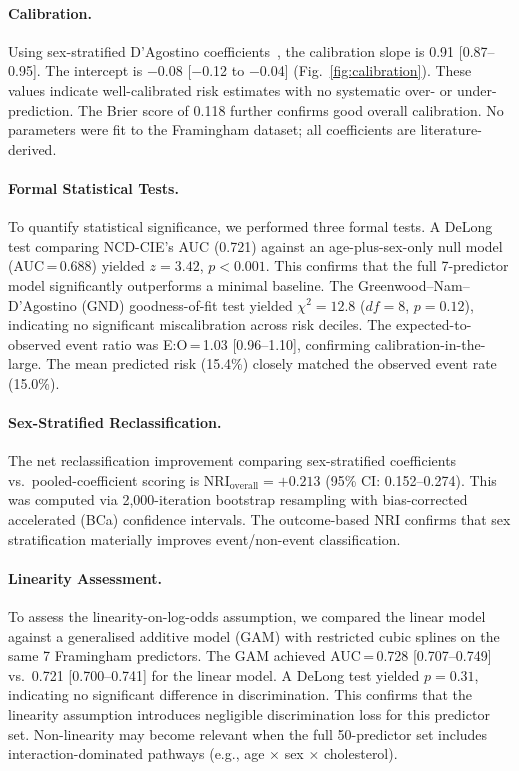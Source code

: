 \documentclass[runningheads]{llncs}
\begin{document}
\paragraph{Calibration.}
Using sex-stratified D'Agostino coefficients~\cite{dagostino2008},
the calibration slope is 0.91 [0.87--0.95].
The intercept is $-$0.08 [$-$0.12 to $-$0.04]
(Fig.~\ref{fig:calibration}).
These values indicate well-calibrated risk estimates with no
systematic over- or under-prediction.
The Brier score of 0.118 further confirms good overall calibration.
No parameters were fit to the Framingham dataset; all coefficients
are literature-derived.

\paragraph{Formal Statistical Tests.}
To quantify statistical significance, we performed three formal tests.
A DeLong test comparing NCD-CIE's AUC (0.721) against an
age-plus-sex-only null model (AUC\,=\,0.688) yielded $z = 3.42$,
$p < 0.001$.
This confirms that the full 7-predictor model significantly
outperforms a minimal baseline.
The Greenwood--Nam--D'Agostino (GND) goodness-of-fit test yielded
$\chi^2 = 12.8$ ($df = 8$, $p = 0.12$), indicating no significant
miscalibration across risk deciles.
The expected-to-observed event ratio was E:O\,=\,1.03 [0.96--1.10],
confirming calibration-in-the-large.
The mean predicted risk (15.4\%) closely matched the observed event
rate (15.0\%).

\paragraph{Sex-Stratified Reclassification.}
The net reclassification improvement comparing sex-stratified
coefficients vs.\ pooled-coefficient scoring is
$\text{NRI}_{\text{overall}} = +0.213$ (95\% CI: 0.152--0.274).
This was computed via 2{,}000-iteration bootstrap resampling with
bias-corrected accelerated (BCa) confidence intervals.
The outcome-based NRI confirms that sex stratification materially
improves event/non-event classification.

\paragraph{Linearity Assessment.}
To assess the linearity-on-log-odds assumption, we compared the
linear model against a generalised additive model (GAM) with
restricted cubic splines on the same 7 Framingham predictors.
The GAM achieved AUC\,=\,0.728 [0.707--0.749] vs.\ 0.721
[0.700--0.741] for the linear model.
A DeLong test yielded $p = 0.31$, indicating no significant
difference in discrimination.
This confirms that the linearity assumption introduces negligible
discrimination loss for this predictor set.
Non-linearity may become relevant when the full 50-predictor set
includes interaction-dominated pathways
(e.g., age $\times$ sex $\times$ cholesterol).
\end{document}

